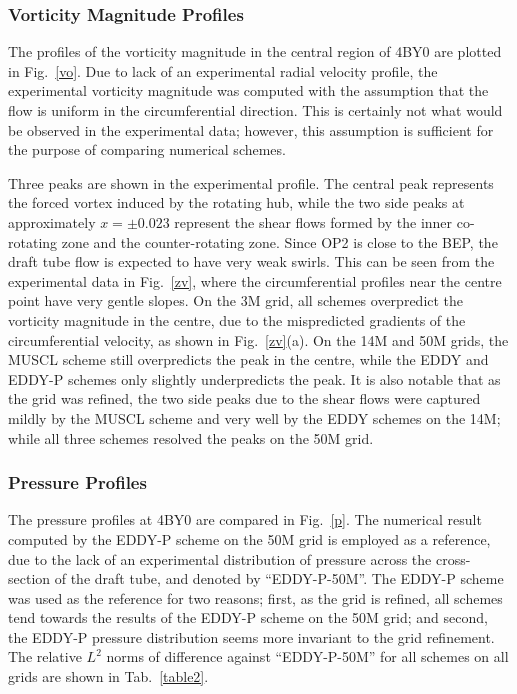 \subsubsection{Vorticity Magnitude Profiles}
The profiles of the vorticity magnitude in the central region of 4BY0 are plotted in Fig.~\ref{vo}. Due to lack of an experimental radial velocity profile, the experimental vorticity magnitude was computed with the assumption that the flow is uniform in the circumferential direction. This is certainly not what would be observed in the experimental data; however, this assumption is sufficient for the purpose of comparing numerical schemes. 

Three peaks are shown in the experimental profile. The central peak represents the forced vortex induced by the rotating hub, while the two side peaks at approximately $x=\pm 0.023$ represent the shear flows formed by the inner co-rotating zone and the counter-rotating zone. Since OP2 is close to the BEP, the draft tube flow is expected to have very weak swirls. This can be seen from the experimental data in Fig.~\ref{zv}, where the circumferential profiles near the centre point have very gentle slopes. On the 3M grid, all schemes overpredict the vorticity magnitude in the centre, due to the mispredicted gradients of the circumferential velocity, as shown in Fig.~\ref{zv}(a). On the 14M and 50M grids, the MUSCL scheme still overpredicts the peak in the centre, while the EDDY and EDDY-P schemes only slightly underpredicts the peak. It is also notable that as the grid was refined, the two side peaks due to the shear flows were captured mildly by the MUSCL scheme and very well by the EDDY schemes on the 14M; while all three schemes resolved the peaks on the 50M grid.
\subsubsection{Pressure Profiles}
The pressure profiles at 4BY0 are compared in Fig.~\ref{p}. The numerical result computed by the EDDY-P scheme on the 50M grid is employed as a reference, due to the lack of an experimental distribution of pressure across the cross-section of the draft tube, and denoted by ``EDDY-P-50M''. The EDDY-P scheme was used as the reference for two reasons; first, as the grid is refined, all schemes tend towards the results of the EDDY-P scheme on the 50M grid; and second, the EDDY-P pressure distribution seems more invariant to the grid refinement. The relative $L^{2}$ norms of difference against ``EDDY-P-50M'' for all schemes on all grids are shown in Tab.~\ref{table2}. 

